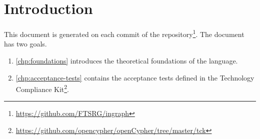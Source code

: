 \chapter{Introduction}
\label{chp:introduction}

This document is generated on each commit of the \ingraph repository\footnote{\url{https://github.com/FTSRG/ingraph}}. The document has two goals.

\begin{enumerate}
	\item \cref{chp:foundations} introduces the theoretical foundations of the \opencypher language.
	\item \cref{chp:acceptance-tests} contains the acceptance tests defined in the \opencypher Technology Compliance Kit\footnote{\url{https://github.com/opencypher/openCypher/tree/master/tck}}.
\end{enumerate}
